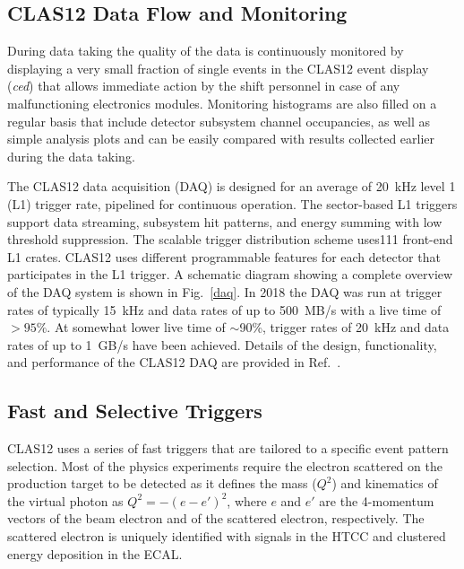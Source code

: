 \documentclass[final,3p,twocolumn]{elsarticle}
\begin{document}
\subsection {CLAS12 Data Flow and Monitoring} 

During data taking the quality of the data is continuously monitored by displaying a very small fraction of single
events in the CLAS12 event display ({\it ced}) that allows immediate action by the shift personnel in case of any
malfunctioning electronics modules. 
Monitoring histograms are also filled on a regular basis that include detector subsystem channel occupancies,
as well as simple analysis plots and can be easily compared with results collected earlier during the data taking.  

The CLAS12 data acquisition (DAQ) is designed for an average of 20~kHz level 1 (L1) trigger rate, pipelined for
continuous operation. The sector-based  L1 triggers support data streaming, subsystem hit patterns, and energy
summing with low threshold suppression.  The scalable trigger distribution scheme uses111 front-end L1
crates. CLAS12 uses different programmable features for each detector that participates in the L1 trigger. A
schematic diagram showing a complete overview of the DAQ system is shown in Fig.~\ref{daq}. In 2018 the DAQ
was run at trigger rates of typically 15~kHz and data rates of up to 500~MB/s with a live time of $> 95\%$. At
somewhat lower live time of $\sim$90\%, trigger rates of 20~kHz and data rates of up to 1~GB/s have been
achieved. Details of the design, functionality, and performance of the CLAS12 DAQ are provided in Ref.~\cite{DAQ}. 
 


\subsection{Fast and Selective Triggers} 

CLAS12 uses a series of fast triggers that are tailored to a specific event pattern selection. Most of the physics
experiments require the electron scattered on the production target to be detected as it defines the mass
($Q^2$) and kinematics of the virtual photon as $Q^2 = -(e - e')^2$, where $e$ and $e'$ are the 4-momentum
vectors of the beam electron and of the scattered electron, respectively. The scattered electron is uniquely identified with
signals in the HTCC and clustered energy deposition in the ECAL. 
\end{document}
